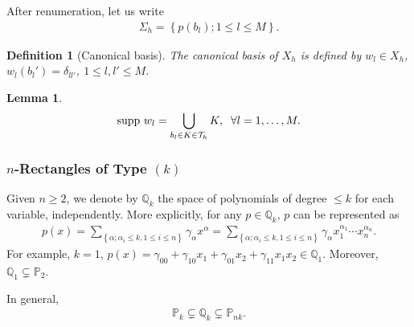 \documentclass[11pt,a4paper,center,notitlepage]{article}
\numberwithin{equation}{section}
\newtheorem{lemma}{Lemma}[section]
\newtheorem{definition}{Definition}[section]
\begin{document}
After renumeration, let us write 
\begin{align}
{\Sigma _h} = \left\{ {p\left( {{b_l}} \right);1 \le l \le M} \right\}.
\end{align}

\begin{definition}[Canonical basis]
The canonical basis of $X_h$ is defined by $w_l\in X_h$, $w_l\left(b_l'\right)=\delta _{ll'}$, $1\le l,l'\le M$.
\end{definition}

\begin{lemma}
\begin{align}
{\rm supp }\ {w_l} = \bigcup\limits_{{b_l} \in K \in {\mathcal{T}_h}} K ,\hspace{2mm} \forall l = 1, \ldots ,M.
\end{align}
\end{lemma}

\subsubsection{$n$-Rectangles of Type $\left(k\right)$}
Given $n\ge 2$, we denote by $\mathbb{Q}_k$ the space of polynomials of degree $\le k$ for each variable, independently. More explicitly, for any $p\in \mathbb{Q}_k$, $p$ can be represented as
\begin{align}
p\left( x \right) = \sum\limits_{\left\{ {\alpha ;{\alpha _i} \le k,1 \le i \le n} \right\}} {{\gamma _\alpha }{x^\alpha }}  = \sum\limits_{\left\{ {\alpha ;{\alpha _i} \le k,1 \le i \le n} \right\}} {{\gamma _\alpha }x_1^{{\alpha _1}} \cdots x_n^{{\alpha _n}}} .
\end{align}
For example, $k=1$, $p\left( x \right) = {\gamma _{00}} + {\gamma _{10}}{x_1} + {\gamma _{01}}{x_2} + {\gamma _{11}}{x_1}{x_2} \in {\mathbb{Q}_1}$. Moreover, $\mathbb{Q}_1 \subsetneq \mathbb{P}_2$.

In general, 
\begin{align}
\mathbb{P}_k \subsetneq \mathbb{Q}_k \subsetneq \mathbb{P}_{nk}.
\end{align}
\end{document}
